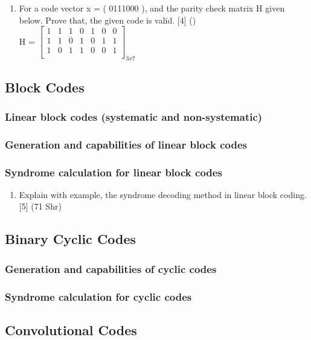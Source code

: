 \documentclass[12pt]{article}
\begin{document}
\begin{enumerate}
        \item For a code vector x = ( 0111000 ), and the parity check matrix H given below. Prove that, the given code is valid. \hfill [4] ()\\
        H = ${\begin{bmatrix}
        	1 & 1 & 1 & 0 & 1 & 0 & 0 \\
        	1 & 1 & 0 & 1 & 0 & 1 & 1 \\
        	1 & 0 & 1 & 1 & 0 & 0 & 1 \\
        \end{bmatrix}}_{3x7}
        $
      \end{enumerate}
      
  \subsection{Block Codes}
    \subsubsection{Linear block codes (systematic and non-systematic)}
    \subsubsection{Generation and capabilities of linear block codes}
    \subsubsection{Syndrome calculation for linear block codes}
    	\begin{enumerate}
    		\item Explain with example, the syndrome decoding method in linear block coding. \hfill [5] (71 Shr)
    	\end{enumerate}
    
  \subsection{Binary Cyclic Codes}
    \subsubsection{Generation and capabilities of cyclic codes}
    \subsubsection{Syndrome calculation for cyclic codes}
  \subsection{Convolutional Codes}
\end{document}

